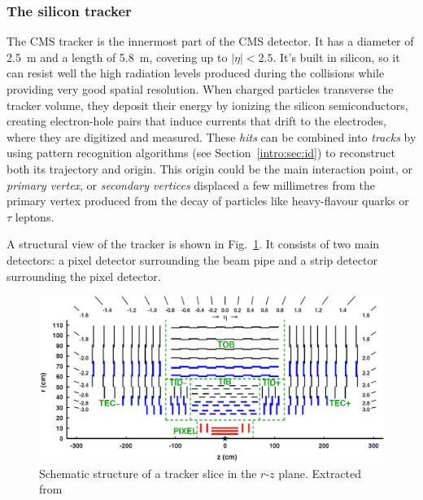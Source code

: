 \documentclass[../main.tex]{subfiles}
\begin{document}
\subsubsection{The silicon tracker}

The CMS tracker \cite{intro:exp:tracker1, intro:exp:tracker2} is the innermost part of the CMS detector. It has a diameter of 2.5~m and a length of 5.8~m, covering up to $|\eta|<2.5$. It's built in silicon, so it can resist well the high radiation levels produced during the collisions while providing very good spatial resolution. When charged particles transverse the tracker volume, they deposit their energy by ionizing the silicon semiconductors, creating electron-hole pairs that induce currents that drift to the electrodes, where they are digitized and measured. These \textit{hits} can be combined into \textit{tracks} by using pattern recognition algorithms (see Section~\ref{intro:sec:id}) to reconstruct both its trajectory and origin. This origin could be the main interaction point, or \textit{primary vertex}, or \textit{secondary vertices} displaced a few millimetres from the primary vertex produced from the decay of particles like heavy-flavour quarks or $\tau$ leptons.

A structural view of the tracker is shown in Fig.~\ref{intro:fig:tracker}. It consists of two main detectors: a pixel detector surrounding the beam pipe and a strip detector surrounding the pixel detector.

\begin{figure}[h!]
\begin{center}
\includegraphics[width=\textwidth]{Images/tracker}
\end{center}
\caption{Schematic structure of a tracker slice in the $r$-$z$ plane. Extracted from \cite{intro:exp:tracker3}}
\label{intro:fig:tracker}
\end{figure}
\end{document}
